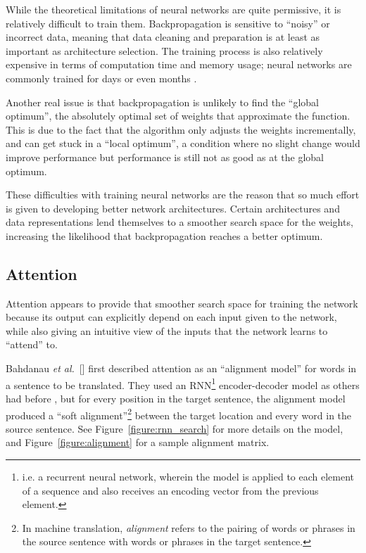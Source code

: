 \documentclass{article}
\newcommand{\etal}{\textit{et al.}}
\begin{document}
While the theoretical limitations of neural networks are quite permissive, it is relatively difficult to train them. Backpropagation is sensitive to ``noisy'' or incorrect data, meaning that data cleaning and preparation is at least as important as architecture selection. The training process is also relatively expensive in terms of computation time and memory usage; neural networks are commonly trained for days or even months \cite{attn_all_you_need}.

Another real issue is that backpropagation is unlikely to find the ``global optimum'', the absolutely optimal set of weights that approximate the function. This is due to the fact that the algorithm only adjusts the weights incrementally, and can get stuck in a ``local optimum'', a condition where no slight change would improve performance but performance is still not as good as at the global optimum.

These difficulties with training neural networks are the reason that so much effort is given to developing better network architectures. Certain architectures and data representations lend themselves to a smoother search space for the weights, increasing the likelihood that backpropagation reaches a better optimum.

\subsection{Attention}

Attention appears to provide that smoother search space for training the network because its output can explicitly depend on each input given to the network, while also giving an intuitive view of the inputs that the network learns to ``attend'' to.

Bahdanau \etal~[\citeyear{joint_align_translate}] first described attention as an ``alignment model'' for words in a sentence to be translated. They used an RNN\footnote{i.e. a recurrent neural network, wherein the model is applied to each element of a sequence and also receives an encoding vector from the previous element.} encoder-decoder model as others had before \cite{encoder_decoders}, but for every position in the target sentence, the alignment model produced a ``soft alignment''\footnote{In machine translation, \textit{alignment} refers to the pairing of words or phrases in the source sentence with words or phrases in the target sentence.} between the target location and every word in the source sentence. See Figure~\ref{figure:rnn_search} for more details on the model, and Figure~\ref{figure:alignment} for a sample alignment matrix.
\end{document}

